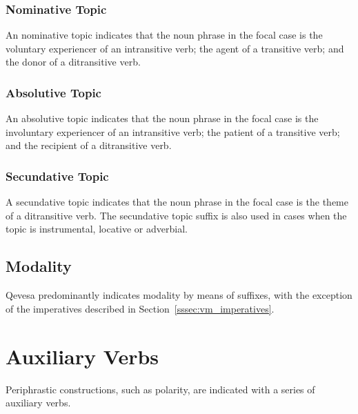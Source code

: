 \documentclass[grammar]{subfiles}
\begin{document}


  \subsubsection{Nominative Topic}
  \label{sssec:vm_nom_topic}

  An nominative topic indicates that the noun phrase in the focal case is the voluntary experiencer of an intransitive verb; the agent of a transitive verb; and the donor of a ditransitive verb.

  \subsubsection{Absolutive Topic}
  \label{sssec:vm_abs_topic}

  An absolutive topic indicates that the noun phrase in the focal case is the involuntary experiencer of an intransitive verb; the patient of a transitive verb; and the recipient of a ditransitive verb. 

  \subsubsection{Secundative Topic}
  \label{sssec:vm_sdt_topic}

  A secundative topic indicates that the noun phrase in the focal case is the theme of a ditransitive verb. The secundative topic suffix is also used in cases when the topic is instrumental, locative or adverbial.
  
  \subsection{Modality}
  \label{ssec:vm_modality}

  Qevesa predominantly indicates modality by means of suffixes, with the exception of the imperatives described in Section~\ref{sssec:vm_imperatives}. 
  
  \ToBeWritten

  \section{Auxiliary Verbs}
  \label{sec:vm_auxiliary}

  Periphrastic constructions, such as polarity, are indicated with a series of auxiliary verbs. 
\end{document}
